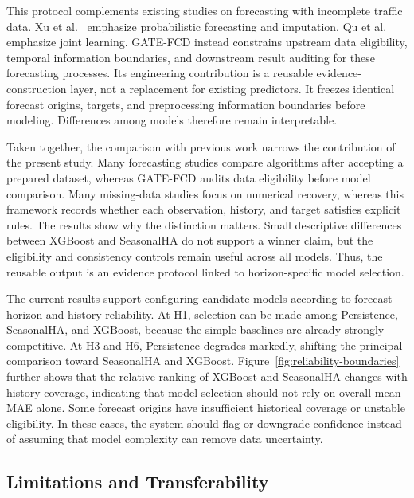 \documentclass[pdflatex,sn-mathphys-num,iicol]{sn-jnl}
\begin{document}
This protocol complements existing studies on forecasting with incomplete traffic data. Xu et al.~\cite{Xu2023AGNP} emphasize probabilistic forecasting and imputation. Qu et al.~\cite{Qu2024TrafficPredictionImputation} emphasize joint learning. GATE-FCD instead constrains upstream data eligibility, temporal information boundaries, and downstream result auditing for these forecasting processes. Its engineering contribution is a reusable evidence-construction layer, not a replacement for existing predictors. It freezes identical forecast origins, targets, and preprocessing information boundaries before modeling. Differences among models therefore remain interpretable.

Taken together, the comparison with previous work narrows the contribution of the present study. Many forecasting studies compare algorithms after accepting a prepared dataset, whereas GATE-FCD audits data eligibility before model comparison. Many missing-data studies focus on numerical recovery, whereas this framework records whether each observation, history, and target satisfies explicit rules. The results show why the distinction matters. Small descriptive differences between XGBoost and SeasonalHA do not support a winner claim, but the eligibility and consistency controls remain useful across all models. Thus, the reusable output is an evidence protocol linked to horizon-specific model selection.

The current results support configuring candidate models according to forecast horizon and history reliability. At H1, selection can be made among Persistence, SeasonalHA, and XGBoost, because the simple baselines are already strongly competitive. At H3 and H6, Persistence degrades markedly, shifting the principal comparison toward SeasonalHA and XGBoost. Figure~\ref{fig:reliability-boundaries} further shows that the relative ranking of XGBoost and SeasonalHA changes with history coverage, indicating that model selection should not rely on overall mean MAE alone. Some forecast origins have insufficient historical coverage or unstable eligibility. In these cases, the system should flag or downgrade confidence instead of assuming that model complexity can remove data uncertainty.



\subsection{Limitations and Transferability}
\label{subsec:limitations-transferability}
\end{document}
